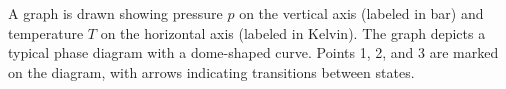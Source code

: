 A graph is drawn showing pressure \( p \) on the vertical axis (labeled in bar) and temperature \( T \) on the horizontal axis (labeled in Kelvin). The graph depicts a typical phase diagram with a dome-shaped curve. Points 1, 2, and 3 are marked on the diagram, with arrows indicating transitions between states.